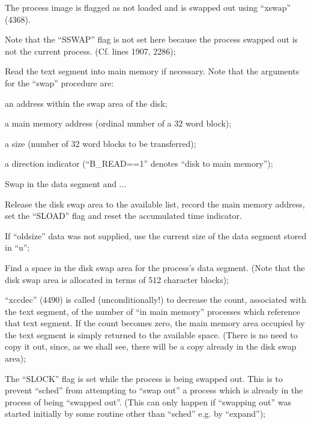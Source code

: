 \item[2022:] The process image is flagged as
 not loaded and is swapped out
 using ``xswap'' (4368).

Note that the ``SSWAP'' flag is not
set here because the process
swapped out is not the current
process. (Cf. lines 1907, 2286);

\item[2032:] Read the text segment into main
 memory if necessary. Note that
 the arguments for the ``swap'' procedure are:
	\bi
	\item an address within the swap area of the disk;

	\item a main memory address (ordinal
number of a 32 word block);

	\item a size (number of 32 word blocks
to be transferred);

\item a direction indicator
(``B\_READ==1'' denotes ``disk to
main memory'');
	\ei

\item[2042:] Swap in the data segment and ...

\item[2044:] Release the disk swap area to the
 available list, record the main
 memory address, set the ``SLOAD''
 flag and reset the accumulated
 time indicator.
\ed


\bd
\item[4373:] If ``oldsize'' data was not supplied, use the current size of
the data segment stored in ``u'';

\item[4375:] Find a space in the disk swap
area for the process's data segment. (Note that the disk swap
area is allocated in terms of 512
character blocks);

\item[4378:] ``xccdec'' (4490) is called (unconditionally!) to decrease the
count, associated with the text
segment, of the number of ``in
main memory'' processes which
reference that text segment. If
the count becomes zero, the main
memory area occupied by the text
segment is simply returned to the
available space. (There is no
need to copy it out, since, as we
shall see, there will be a copy
already in the disk swap area);

\item[4379:] The ``SLOCK'' flag is set while the
process is being swapped out.
This is to prevent ``sched'' from
attempting to ``swap out'' a process which is already in the process of being ``swapped out''.
(This can only happen if ``swapping out'' was started initially
by some routine other than
``sched'' e.g. by ``expand'');

